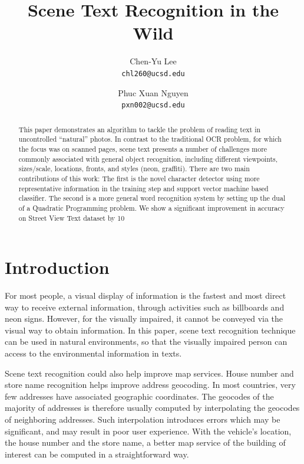 \documentclass[10pt,twocolumn,letterpaper]{article}
\begin{document}
\title{Scene Text Recognition in the Wild}

\author{Chen-Yu Lee\\
{\tt\small chl260@ucsd.edu}
\and
Phuc Xuan Nguyen\\
{\tt\small pxn002@ucsd.edu}
}

\maketitle
\thispagestyle{empty}

\begin{abstract}
This paper demonstrates an algorithm to tackle the problem of reading text in uncontrolled ``natural'' photos. In contrast to the traditional OCR problem, for which the focus was on scanned pages, scene text presents a number of challenges more commonly associated with general object recognition, including different viewpoints, sizes/scale, locations, fronts, and styles (neon, graffiti). There are two main contributions of this work: The first is the novel character detector using more representative information in the training step and support vector machine based classifier. The second is a more general word recognition system by setting up the dual of a Quadratic Programming problem. We show a significant improvement in accuracy on Street View Text dataset by 10%
\end{abstract}

\section{Introduction}

For most people, a visual display of information is the fastest and most direct way to receive external information, through activities such as billboards and neon signs. However, for the visually impaired, it cannot be conveyed via the visual way to obtain information. In this paper, scene text recognition technique can be used in natural environments, so that the visually impaired person can access to the environmental information in texts.

Scene text recognition could also help improve map services. House number and store name recognition helps improve address geocoding. In most countries, very few addresses have associated geographic coordinates. The geocodes of the majority of addresses is therefore usually computed by interpolating the geocodes of neighboring addresses. Such interpolation introduces errors which may be significant, and may result in poor user experience. With the vehicle's location, the house number and the store name, a better map service of the building of interest can be computed in a straightforward way.
\end{document}
